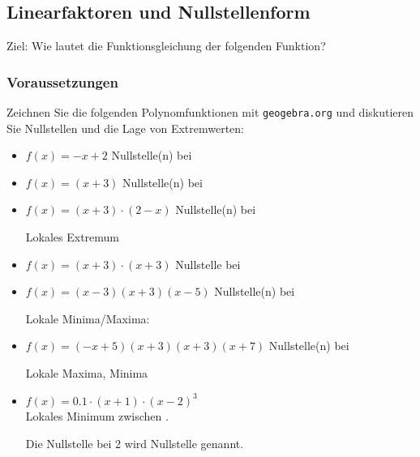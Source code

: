 


\newpage


\subsection{Linearfaktoren und Nullstellenform}

Ziel: Wie lautet die Funktionsgleichung der folgenden Funktion?


\newpage

\subsubsection{Voraussetzungen}

Zeichnen Sie die folgenden Polynomfunktionen mit \texttt{geogebra.org}
und diskutieren Sie Nullstellen und die Lage von Extremwerten:

\begin{itemize}
\item $f(x) = -x + 2 $ Nullstelle(n) bei  
\item $f(x) = (x+3)$ Nullstelle(n) bei 
\item $f(x) = (x+3)\cdot{}(2-x)$ Nullstelle(n) bei 
  
  Lokales Extremum
  
\item $f(x) = (x+3)\cdot{}(x+3)$ 
  Nullstelle bei 
  
\item $f(x) = (x-3)(x+3)(x-5)$ Nullstelle(n) bei 
  
Lokale Minima/Maxima: 
  
\item $f(x) = (-x+5)(x+3)(x+3)(x+7)$ Nullstelle(n) bei
  
  Lokale Maxima, Minima


\item $f(x) = 0.1 \cdot{} (x+1)\cdot{}(x-2)^3$\\
  Lokales Minimum zwischen .

  Die Nullstelle bei 2 wird  Nullstelle genannt.
  
\end{itemize}


